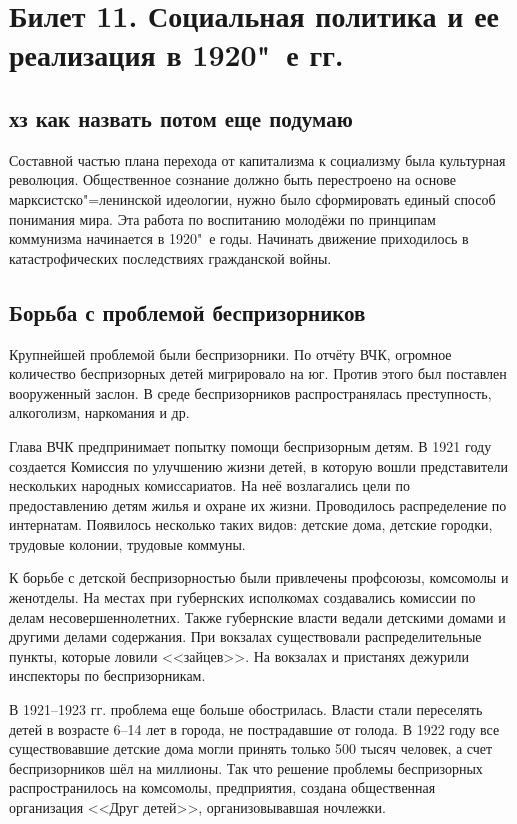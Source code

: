 \section{Билет 11. Социальная политика и ее реализация в 1920"~е гг.}

\subsection{хз как назвать потом еще подумаю}

Составной частью плана перехода от капитализма к социализму была культурная революция. Общественное сознание должно быть перестроено на основе марксистско"=ленинской идеологии, нужно было сформировать единый способ понимания мира. Эта работа по воспитанию молодёжи по принципам коммунизма начинается в 1920"~е годы. Начинать движение приходилось в катастрофических последствиях гражданской войны.

\subsection{Борьба с проблемой беспризорников}

Крупнейшей проблемой были беспризорники. По отчёту ВЧК, огромное количество беспризорных детей мигрировало на юг. Против этого был поставлен вооруженный заслон. В среде беспризорников распространялась преступность, алкоголизм, наркомания и др. 

Глава ВЧК предпринимает попытку помощи беспризорным детям. В 1921 году создается Комиссия по улучшению жизни детей, в которую вошли представители нескольких народных комиссариатов. На неё возлагались цели по предоставлению детям жилья и охране их жизни. Проводилось распределение по интернатам. Появилось несколько таких видов: детские дома, детские городки, трудовые колонии, трудовые коммуны. 

К борьбе с детской беспризорностью были привлечены профсоюзы, комсомолы и женотделы. На местах при губернских исполкомах создавались комиссии по делам несовершеннолетних. Также губернские власти ведали детскими домами и другими делами содержания. При вокзалах существовали распределительные пункты, которые ловили <<зайцев>>. На вокзалах и пристанях дежурили инспекторы по беспризорникам.

В 1921--1923 гг. проблема еще больше обострилась. Власти стали переселять детей в возрасте 6--14 лет в города, не пострадавшие от голода. В 1922 году все существовавшие детские дома могли принять только 500 тысяч человек, а счет беспризорников шёл на миллионы. Так что решение проблемы беспризорных распространилось на комсомолы, предприятия, создана общественная организация <<Друг детей>>, организовывавшая ночлежки.

